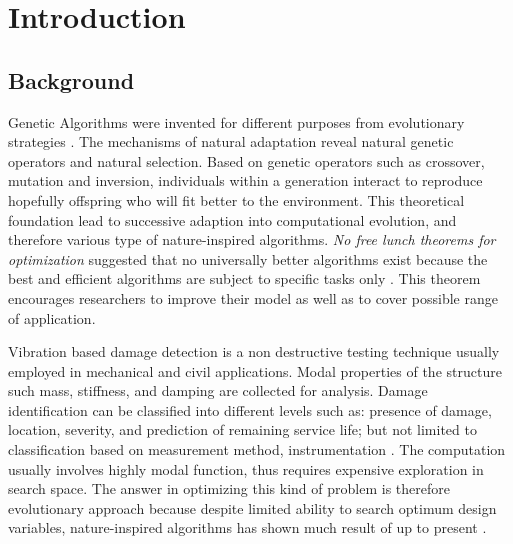 \chapter{Introduction}
\thispagestyle{empty}

\section{Background}

Genetic Algorithms were invented for different purposes from evolutionary strategies \cite{melanie99}. The mechanisms of natural adaptation reveal natural genetic operators and natural selection. Based on genetic operators such as crossover, mutation and inversion, individuals within a generation interact to reproduce hopefully offspring who will fit better to the environment. This theoretical foundation lead to successive adaption into computational evolution, and therefore various type of nature-inspired algorithms. \emph{No free lunch theorems for optimization} \cite{wolpert1997} suggested that no universally better algorithms exist because the best and efficient algorithms are subject to specific tasks only \cite{yang2010}. This 
theorem encourages researchers to improve their model as well as to cover possible range of application.


Vibration based damage detection is a non destructive testing technique usually employed in mechanical and civil applications. Modal properties of the structure such mass, stiffness, and damping are collected for analysis. Damage identification can be classified into different levels such as: presence of damage, location, severity, and prediction of remaining service life; but not limited to classification based on measurement method, instrumentation \cite{doebling1998}. The computation usually involves highly modal function, thus requires expensive exploration in search space. The answer in optimizing this kind of problem is therefore evolutionary approach because despite limited ability to search optimum design variables, nature-inspired algorithms has shown much result of 
up to present \cite{yang2010}.

